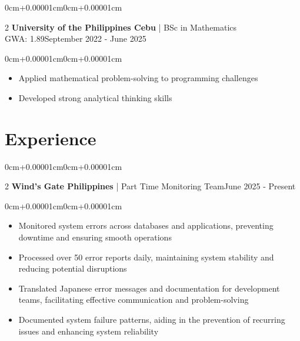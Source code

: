 \documentclass[10pt, letterpaper]{article}
\newenvironment{highlights}{\begin{itemize}[topsep=0.10cm,parsep=0.10cm,partopsep=0pt,itemsep=0pt,leftmargin=0cm+10pt]}{\end{itemize}}
\newenvironment{onecolentry}{\begin{adjustwidth}{0cm+0.00001cm}{0cm+0.00001cm}}{\end{adjustwidth}}
\newenvironment{twocolentry}[2][]{\onecolentry\def\secondColumn{#2}\setcolumnwidth{\fill,5cm}\begin{paracol}{2}}{\switchcolumn \raggedleft \secondColumn\end{paracol}\endonecolentry}
\begin{document}
    \begin{twocolentry}{September 2022 - June 2025}
    \textbf{University of the Philippines Cebu} | BSc in Mathematics\\
    GWA: 1.89\end{twocolentry}
    \vspace{0.10cm}
    \begin{onecolentry}
        \small
        \begin{highlights}
            \item Applied mathematical problem-solving to programming challenges
            \item Developed strong analytical thinking skills
        \end{highlights}
    \end{onecolentry}
    \vspace{0.15cm}

\section{Experience}

    \begin{twocolentry}{June 2025 - Present}
    \textbf{Wind's Gate Philippines} | Part Time Monitoring Team\end{twocolentry}
    \vspace{0.10cm}
    \begin{onecolentry}
        \small
    \begin{highlights}
                \item Monitored system errors across databases and applications, preventing downtime and ensuring smooth operations
            \item Processed over 50 error reports daily, maintaining system stability and reducing potential disruptions
            \item Translated Japanese error messages and documentation for development teams, facilitating effective communication and problem-solving
            \item Documented system failure patterns, aiding in the prevention of recurring issues and enhancing system reliability
        \end{highlights}
    \end{onecolentry}
    \vspace{0.15cm}
\end{document}
